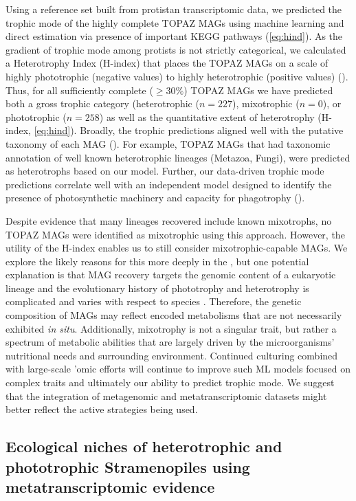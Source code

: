 \documentclass[12pt]{article}
\numberwithin{equation}{section}
\begin{document}
Using a reference set built from protistan transcriptomic data, we predicted the trophic mode of the highly complete TOPAZ MAGs using machine learning and direct estimation via presence of important KEGG pathways (\cref{eq:hind}). As the gradient of trophic mode among protists is not strictly categorical, we calculated a Heterotrophy Index (H-index) that places the TOPAZ MAGs on a scale of highly phototrophic (negative values) to highly heterotrophic (positive values) (). Thus, for all sufficiently complete ($\geq30\%$) TOPAZ MAGs we have predicted both a gross trophic category (heterotrophic ($n=227$), mixotrophic ($n=0$), or phototrophic ($n=258$) as well as the quantitative extent of heterotrophy (H-index, \cref{eq:hind}). Broadly, the trophic predictions aligned well with the putative taxonomy of each MAG (). For example, TOPAZ MAGs that had taxonomic annotation of well known heterotrophic lineages (Metazoa, Fungi),  were predicted as heterotrophs based on our model.  Further, our data-driven trophic mode predictions correlate well with an independent model designed to identify the presence of photosynthetic machinery and capacity for phagotrophy \citep{burns2018gene} (). 

Despite evidence that many lineages recovered include known mixotrophs, no TOPAZ MAGs were identified as mixotrophic using this approach. However, the utility of the H-index enables us to still consider mixotrophic-capable MAGs. We explore the likely reasons for this more deeply in the , but one potential explanation is that MAG recovery targets the genomic content of a eukaryotic lineage and the evolutionary history of phototrophy and heterotrophy is complicated and varies with respect to species \citep{Flynn_2019}. Therefore, the genetic composition of MAGs may reflect encoded metabolisms that are not necessarily exhibited \textit{in situ}. Additionally, mixotrophy is not a singular trait, but rather a spectrum of metabolic abilities that are largely driven by the microorganisms' nutritional needs and surrounding environment. Continued culturing combined with large-scale 'omic efforts will continue to improve such ML models focused on complex traits and ultimately our ability to predict trophic mode. We suggest that the integration of metagenomic and metatranscriptomic datasets might better reflect the active strategies being used. 

\subsection*{Ecological niches of heterotrophic and phototrophic Stramenopiles using metatranscriptomic evidence}
\end{document}
